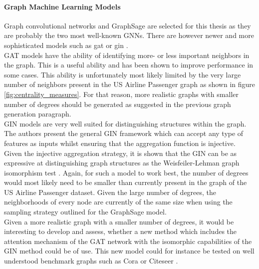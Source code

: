   \paragraph{Graph Machine Learning Models}\mbox{}

  \noindent Graph convolutional networks and GraphSage are selected for this
  thesis as they are probably the two most well-known GNNs. There are however 
  newer and more sophisticated models such as \ac{gat} \citep{velivckovic2018graph} 
  or \ac{gin} \citep{xu2019powerful}. \\

  \noindent GAT models have the ability of identifying more- or 
  less important neighbors in the graph. This is a useful ability and has been 
  shown to improve performance in some cases. This ability is unfortunately 
  most likely limited by the very large number of neighbors present in the US Airline 
  Passenger graph as shown in figure \ref{fig:centrality_measures}. For that
  reason, more realistic graphs with smaller number of degrees should be
  generated as suggested in the previous graph generation paragraph. \\

  \noindent GIN models are very well suited for distinguishing structures 
  within the graph. The authors \cite{xu2019powerful} present the general GIN
  framework which can accept any type of features as inputs whilst ensuring
  that the aggregation function is injective. Given the injective aggregation
  strategy, it is shown that the GIN can be as expressive at distinguishing
  graph structures as the Weisfeiler-Lehman graph isomorphism test 
  \citep{weisfeiler1968}. Again, for such a model to work best, the number of
  degrees would most likely need to be smaller than currently present in the
  graph of the US Airline Passenger dataset. Given the large number of degrees,
  the neighborhoods of every node are currently of the same size when using the
  sampling strategy outlined for the GraphSage model. \\

  \noindent Given a more realistic graph with a smaller number of degrees, it
  would be interesting to develop and assess, whether a new method which
  includes the attention mechanism of the GAT network with the isomorphic 
  capabilities of the GIN method could be of use. This new model could for
  instance be tested on well understood benchmark graphs such as Cora
  \citep{mccallum2000automating} or Citeseer \citep{giles1998citeseer}. 

